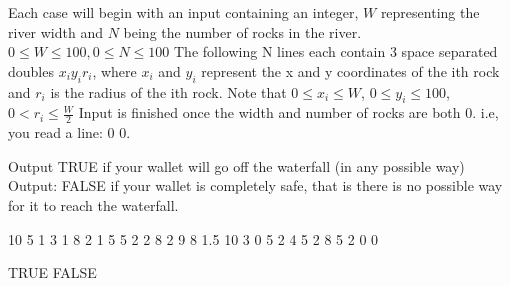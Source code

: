 \documentclass{article}
\begin{document}
\needspace{5em}
\begin{inputDescription}
Each case will begin with an input containing an integer, $W$ representing the river width and $N$ being the number of rocks in the river. $0 \leq W \leq 100, 0 \leq N \leq 100$
The following N lines each contain 3 space separated doubles $x_i y_i r_i$, where $x_i$ and $y_i$ represent the x and y coordinates of the ith rock and $r_i$ is the radius of the ith rock. Note that $0 \leq x_i \leq W$, $ 0 \leq y_i \leq 100$, $ 0 < r_i \leq \frac{W}{2}$
Input is finished once the width and number of rocks are both 0. i.e, you read a line: 0 0.
\end{inputDescription}

\needspace{5em}

\begin{outputDescription}
Output TRUE if your wallet will go off the waterfall (in any possible way)
Output: FALSE if your wallet is completely safe, that is there is no possible way for it to reach the waterfall.
\end{outputDescription}

\begin{sampleInput}
10 5
1 3 1
8 2 1
5 5 2
2 8 2
9 8 1.5
10 3
0 5 2
4 5 2
8 5 2
0 0
\end{sampleInput}
\begin{sampleOutput}
TRUE
FALSE
\end{sampleOutput}
\end{document}
